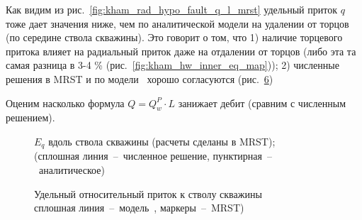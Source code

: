 \documentclass{article}
\begin{document}
Как видим из рис.~\ref{fig:kham_rad_hypo_fault_q_l_mrst} удельный приток $q$ тоже дает значения ниже, чем по аналитической модели на удалении от торцов (по середине ствола скважины). Это говорит о том, что 1) наличие торцевого притока влияет на радиальный приток даже на отдалении от торцов (либо эта та самая разница в 3-4 \% (рис.~\ref{fig:kham_hw_inner_eq_map})); 2) численные решения в MRST и по модели~\cite{lit:kham_mazo_uzku_2015} хорошо согласуются (рис.~\ref{fig:kham_well_along_ql_H015_L5_rw0001_mgrp_mrst})

Оценим насколько формула $Q = Q_w^P \cdot L$ занижает дебит (сравним с численным решением).

\begin{figure}[h!]
\centering
\begin{subfigure}{0.48\textwidth}

\caption{}
\label{fig:kham_Rq_map_L0.5_mrst}
\end{subfigure}
\hfill
\begin{subfigure}{0.48\textwidth}

\caption{}
\label{fig:kham_Rq_map_L1_mrst}
\end{subfigure}

\begin{subfigure}{0.48\textwidth}

\caption{}
\label{fig:kham_Rq_map_L5_mrst}
\end{subfigure}
\hfill
\begin{subfigure}{0.48\textwidth}

\caption{}
\label{fig:kham_Rq_map_L10_mrst}
\end{subfigure}

\caption{
$E_q$ вдоль ствола скважины (расчеты сделаны в MRST);
\\ (сплошная линия~--~численное решение, пунктирная~--~аналитическое)
}
\label{fig:kham_Rq_map_mrst}
\end{figure}

\begin{figure}[!ht]
\centering

\label{fig:kham_well_along_ql_H015_L5_rw0001_mgrp_mrst}
\caption{Удельный относительный приток к стволу скважины \\
сплошная линия~--~модель~\cite{lit:kham_mazo_uzku_2015}, маркеры~--~MRST)}
\end{figure}
\end{document}
